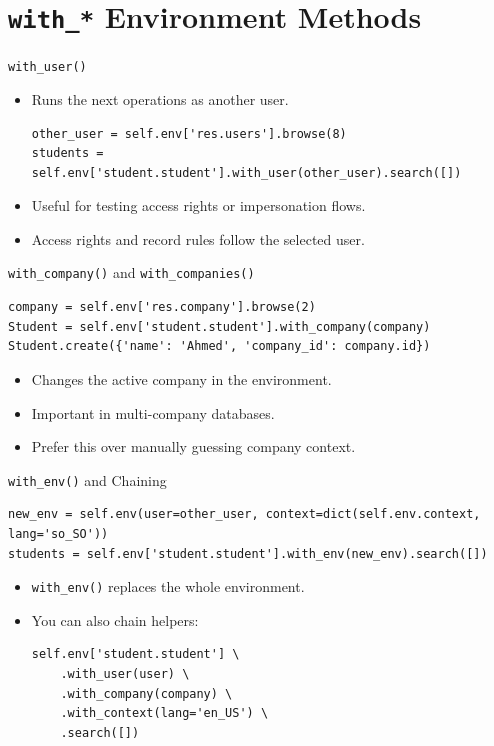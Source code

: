 \section{\texttt{with\_*} Environment Methods}

\begin{frame}[fragile]{\texttt{with\_user()}}
	\begin{itemize}
		\item Runs the next operations as another user.
\begin{lstlisting}
other_user = self.env['res.users'].browse(8)
students = self.env['student.student'].with_user(other_user).search([])
\end{lstlisting}
		\item Useful for testing access rights or impersonation flows.
		\item Access rights and record rules follow the selected user.
	\end{itemize}
\end{frame}

\begin{frame}[fragile]{\texttt{with\_company()} and \texttt{with\_companies()}}
\begin{lstlisting}
company = self.env['res.company'].browse(2)
Student = self.env['student.student'].with_company(company)
Student.create({'name': 'Ahmed', 'company_id': company.id})
\end{lstlisting}
	\begin{itemize}
		\item Changes the active company in the environment.
		\item Important in multi-company databases.
		\item Prefer this over manually guessing company context.
	\end{itemize}
\end{frame}

\begin{frame}[fragile]{\texttt{with\_env()} and Chaining}
\begin{lstlisting}
new_env = self.env(user=other_user, context=dict(self.env.context, lang='so_SO'))
students = self.env['student.student'].with_env(new_env).search([])
\end{lstlisting}
	\begin{itemize}
		\item \texttt{with\_env()} replaces the whole environment.
		\item You can also chain helpers:
\begin{lstlisting}
self.env['student.student'] \
	.with_user(user) \
	.with_company(company) \
	.with_context(lang='en_US') \
	.search([])
\end{lstlisting}
	\end{itemize}
\end{frame}

